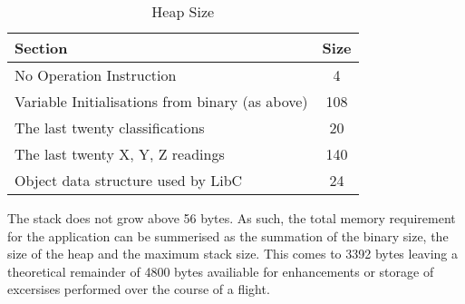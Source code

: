\begin{table}[]
    \centering
    \begin{tabular}{|l|c|}
        \hline
        Section & Size \\
        \hline
        No Operation Instruction & 4 \\
        Variable Initialisations from binary (as above) & 108 \\
        The last twenty classifications & 20 \\
        The last twenty X, Y, Z readings & 140 \\
        Object data structure used by LibC & 24 \\
        \hline
    \end{tabular}
    \caption{Heap Size \label{tab:heap-size}}
\end{table}

The stack does not grow above 56 bytes. As such, the total memory requirement for the application can be summerised as the summation of the binary size, the size of the heap and the maximum stack size. This comes to 3392 bytes leaving a theoretical remainder of 4800 bytes availiable for enhancements or storage of excersises performed over the course of a flight.